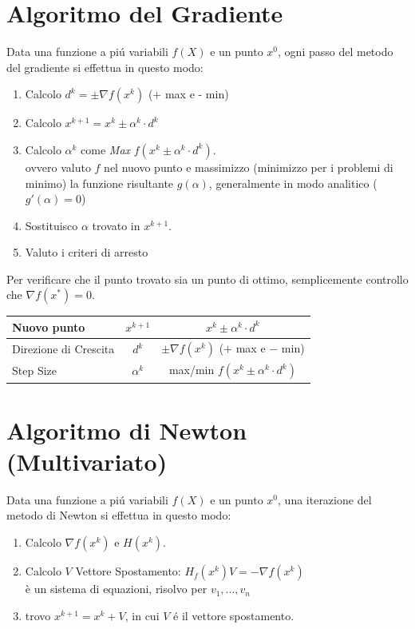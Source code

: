 \documentclass[12pt, a4paper, openany]{book}
\begin{document}
\section{Algoritmo del Gradiente}
Data una funzione a piú variabili $f(X)$ e un punto $x^0$, ogni passo del metodo del gradiente si effettua in questo modo:

\begin{enumerate}
	\item Calcolo $d^k=\pm \nabla f(x^k)$ ($+$ max e - min)
	\item Calcolo $x^{k+1} = x^k \pm \alpha^k \cdot d^k$
	\item Calcolo $\alpha^k$ come \emph{Max} $f(x^k \pm \alpha^k \cdot d^k)$.
			\\\small{ovvero valuto $f$ nel nuovo punto e massimizzo (minimizzo per i problemi di minimo) la funzione risultante $g(\alpha)$, generalmente in modo analitico ($g'(\alpha)=0$)}
	\item Sostituisco $\alpha$ trovato in $x^{k+1}$.
	\item Valuto i criteri di arresto
\end{enumerate}
Per verificare che il punto trovato sia un punto di ottimo, semplicemente controllo che $\nabla f(x^*) = 0$.
\begin{center}
	\begin{tabular}{|l|c|c|}
		\hline
		Nuovo punto & $x^{k+1}$ & $ x^k \pm \alpha^k \cdot d^k$\\
		\hline
		Direzione di Crescita & $d^k$ & $\pm \nabla f(x^k)$ ($+$ max e $-$ min)\\
		\hline
		Step Size & $\alpha^k$ & max/min $f(x^k \pm \alpha^k \cdot d^k)$\\
		\hline
	\end{tabular}
\end{center}

\pagebreak

\section{Algoritmo di Newton (Multivariato)}
Data una funzione a piú variabili $f(X)$ e un punto $x^0$, una iterazione del metodo di Newton si effettua in questo modo:
\begin{enumerate}
	\item Calcolo $\nabla f(x^k)$ e $H(x^k)$.
	\item Calcolo $V$ Vettore Spostamento: $H_f(x^k) V = - \nabla f(x^k)$
		\\ \small{è un sistema di equazioni, risolvo per $v_1,...,v_n$}
	\item trovo $x^{k+1} = x^k + V$, in cui $V$ é il vettore spostamento.
\end{enumerate}
\end{document}

